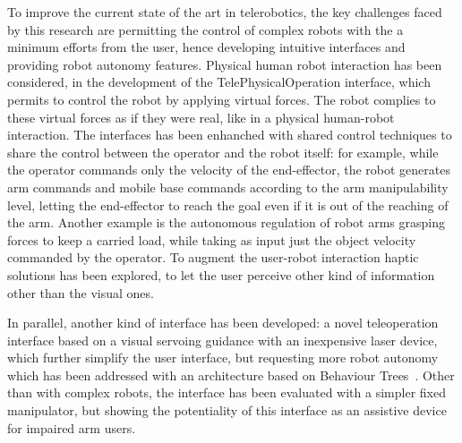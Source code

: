 To improve the current state of the art in telerobotics, the key challenges faced by this research are permitting the control of complex robots with the a minimum efforts from the user, hence developing intuitive interfaces and providing robot autonomy features.
Physical human robot interaction has been considered, in the development of the TelePhysicalOperation interface, which permits to control the robot by applying virtual forces. The robot complies to these virtual forces as if they were real, like in a physical human-robot interaction. The interfaces has been enhanched with shared control techniques to share the control between the operator and the robot itself: for example, while the operator commands only the velocity of the end-effector, the robot generates arm commands and mobile base commands according to the arm manipulability level, letting the end-effector to reach the goal even if it is out of the reaching of the arm. Another example is the autonomous regulation of robot arms grasping forces to keep a carried load, while taking as input just the object velocity commanded by the operator. 
To augment the user-robot interaction haptic solutions has been explored, to let the user perceive other kind of information other than the visual ones. 

In parallel, another kind of interface has been developed: a novel teleoperation interface based on a visual servoing guidance with an inexpensive laser device, which further simplify the user interface, but requesting more robot autonomy which has been addressed with an architecture based on Behaviour Trees~\cite{Iovino2022}. Other than with complex robots, the interface has been evaluated with a simpler fixed manipulator, but showing the potentiality of this interface as an assistive device for impaired arm users.
	
